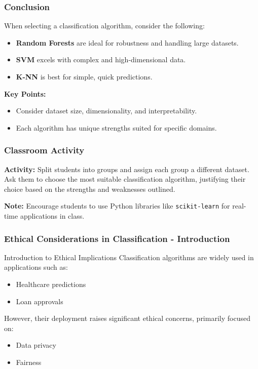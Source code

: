 \documentclass[aspectratio=169]{beamer}
\begin{document}
\begin{frame}[fragile]
    \frametitle{Conclusion}
    When selecting a classification algorithm, consider the following:
    \begin{itemize}
        \item \textbf{Random Forests} are ideal for robustness and handling large datasets.
        \item \textbf{SVM} excels with complex and high-dimensional data.
        \item \textbf{K-NN} is best for simple, quick predictions.
    \end{itemize}
    
    \textbf{Key Points:}
    \begin{itemize}
        \item Consider dataset size, dimensionality, and interpretability.
        \item Each algorithm has unique strengths suited for specific domains.
    \end{itemize}
\end{frame}

\begin{frame}[fragile]
    \frametitle{Classroom Activity}
    \textbf{Activity:} 
    Split students into groups and assign each group a different dataset. 
    Ask them to choose the most suitable classification algorithm, justifying their choice based on the strengths and weaknesses outlined.
    
    \textbf{Note:}
    Encourage students to use Python libraries like \texttt{scikit-learn} for real-time applications in class.
\end{frame}

\begin{frame}[fragile]
    \frametitle{Ethical Considerations in Classification - Introduction}
    \begin{block}{Introduction to Ethical Implications}
        Classification algorithms are widely used in applications such as:
        \begin{itemize}
            \item Healthcare predictions
            \item Loan approvals
        \end{itemize}
        However, their deployment raises significant ethical concerns, primarily focused on:
        \begin{itemize}
            \item Data privacy
            \item Fairness
        \end{itemize}
    \end{block}
\end{frame}
\end{document}
